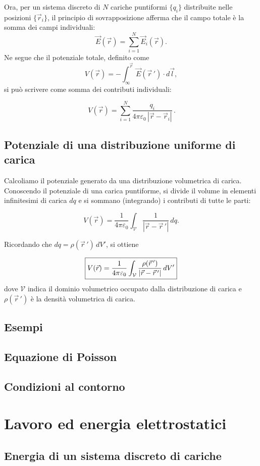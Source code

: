 \documentclass{book}
\begin{document}
Ora, per un sistema discreto di \(N\) cariche puntiformi \(\{q_i\}\) distribuite nelle posizioni \(\{\vec r_i\}\), il principio di sovrapposizione afferma che il campo totale è la somma dei campi individuali:
\[
\vec{E}(\vec r)=\sum_{i=1}^N \vec{E}_i(\vec r).
\]
Ne segue che il potenziale totale, definito come
\[
V(\vec r) = -\int_{\infty}^{\vec r} \vec{E}(\vec r\,')\cdot d\vec l,
\]
si può scrivere come somma dei contributi individuali:

\[
\boxed{\,V(\vec r)=\sum_{i=1}^{N}\dfrac{q_i}{4\pi\varepsilon_0\,|\vec r-\vec r_i|}\, .}
\]

\section{Potenziale di una distribuzione uniforme di carica}

Calcoliamo il potenziale generato da una distribuzione volumetrica di carica. Conoscendo il potenziale di una carica puntiforme, si divide il volume in elementi infinitesimi di carica \(dq\) e si sommano (integrando) i contributi di tutte le parti:

\[
V(\vec{r}) = \frac{1}{4\pi\varepsilon_0}\int_{\mathcal{V}}\frac{1}{|\vec{r}-\vec{r}\,'|}\,dq.
\]

Ricordando che \(dq=\rho(\vec{r}\,')\,dV'\), si ottiene

\[
\boxed{%
V(\vec{r}) = \frac{1}{4\pi\varepsilon_0}\int_{\mathcal{V}}\frac{\rho(\vec{r}\,')}{|\vec{r}-\vec{r}\,'|}\,dV'
}
\]
dove \(\mathcal{V}\) indica il dominio volumetrico occupato dalla distribuzione di carica e \(\rho(\vec r\,')\) è la densità volumetrica di carica.


\section{Esempi}
\section{Equazione di Poisson}
\section{Condizioni al contorno}

\chapter{Lavoro ed energia elettrostatici}
\section{Energia di un sistema discreto di cariche}
\end{document}
